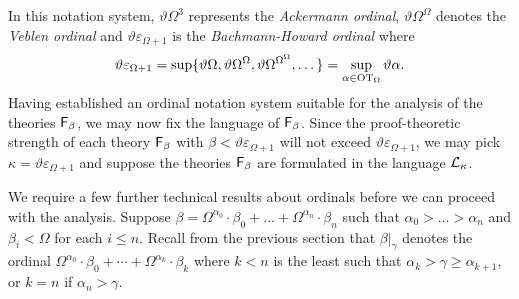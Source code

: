 \documentclass[UKenglish,cleveref,DIV=12]{scrartcl}
\theoremstyle{definition}
\theoremstyle{definition}
\begin{document}
In this notation system, $\vartheta\Omega^3$ represents the {\em Ackermann ordinal}, $\vartheta\Omega^\Omega$ denotes the {\em Veblen ordinal} and $\vartheta\varepsilon_{\Omega+1}$ is the {\em Bachmann-Howard ordinal} where
\begin{align*}
 \vartheta\varepsilon_{\Omega+1}=\sup\{\vartheta\Omega, \vartheta\Omega^\Omega,\vartheta\Omega^{\Omega^\Omega},\dots\}=\sup_{\alpha\in\mathrm{OT}_\Omega}\vartheta\alpha.
\end{align*}
Having established an ordinal notation system suitable for the analysis of the theories $\mathsf{F}_\beta$, we may now fix the language of $\mathsf{F}_\beta$. Since the proof-theoretic strength of each theory $\mathsf{F}_\beta$ with $\beta<\vartheta\varepsilon_{\Omega+1}$ will not exceed $\vartheta\varepsilon_{\Omega+1}$, we may pick $\kappa=\vartheta\varepsilon_{\Omega+1}$ and suppose the theories $\mathsf{F}_\beta$ are formulated in the language $\mathcal{L}_\kappa$.

We require a few further technical results about ordinals before we can proceed with
the analysis. Suppose
$\beta=\Omega^{\alpha_0}\cdot\beta_0+\dots+\Omega^{\alpha_n}\cdot\beta_n$ such
that $\alpha_0>\dots>\alpha_n$ and $\beta_i<\Omega$ for each $i\le n$. Recall
from the previous section that $\beta|_\gamma$ denotes the ordinal
$\Omega^{\alpha_0}\cdot\beta_0+\cdots+\Omega^{\alpha_k}\cdot\beta_k$ where $k<n$
is the least such that $\alpha_{k}>\gamma\ge\alpha_{k+1}$, or $k=n$ if
$\alpha_n>\gamma$.
\end{document}
